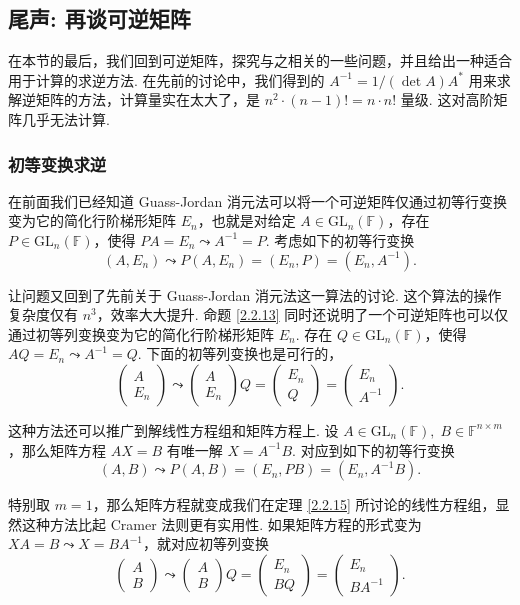 \documentclass[10pt,openany]{article}
\theoremstyle{thmstyle} %
\theoremstyle{defstyle} %
\theoremstyle{prostyle} %
\theoremstyle{exastyle}
\theoremstyle{remstyle}
\newcommand{\F}{\mathbb{F}}
\newcommand{\gf}{\text{GL}_n(\mathbb{F})}
\newcommand{\nm}{^{n \times m}}
\begin{document}
\subsection{尾声: 再谈可逆矩阵}

在本节的最后，我们回到可逆矩阵，探究与之相关的一些问题，并且给出一种适合用于计算的求逆方法. 在先前的讨论中，我们得到的 \( A^{-1}= 1/(\det A) A^* \) 用来求解逆矩阵的方法，计算量实在太大了，是 \( n^2 \cdot (n-1)!=n \cdot n! \) 量级. 这对高阶矩阵几乎无法计算.

\subsubsection{初等变换求逆}

在前面我们已经知道 Guass-Jordan 消元法可以将一个可逆矩阵仅通过初等行变换变为它的简化行阶梯形矩阵 \( E_n \)，也就是对给定 \( A \in \gf \)，存在 \(  P \in \gf \)，使得 \( PA=E_n \leadsto A^{-1}=P \). 考虑如下的初等行变换
\[ (A,E_n) \leadsto P(A,E_n)=(E_n,P)=(E_n,A^{-1}). \]

让问题又回到了先前关于  Guass-Jordan 消元法这一算法的讨论. 这个算法的操作复杂度仅有 \( n^3 \)，效率大大提升. 命题 \ref{2.2.13} 同时还说明了一个可逆矩阵也可以仅通过初等列变换变为它的简化行阶梯形矩阵 \( E_n \). 存在 \( Q \in \gf \)，使得 \( AQ=E_n \leadsto A^{-1}=Q \). 下面的初等列变换也是可行的，
\[ \begin{pmatrix}
	A \\ E_n
\end{pmatrix} \leadsto \begin{pmatrix}
A \\ E_n
\end{pmatrix}Q=\begin{pmatrix}
E_n \\ Q
\end{pmatrix}=\begin{pmatrix}
E_n \\ A^{-1}
\end{pmatrix}. \]

这种方法还可以推广到解线性方程组和矩阵方程上. 设 \( A \in \gf, \; B \in \F\nm \)，那么矩阵方程 \( AX=B \) 有唯一解 \( X=A^{-1}B \). 对应到如下的初等行变换
\[ (A,B) \leadsto P(A,B)=(E_n,PB)=(E_n,A^{-1}B). \]

特别取 \( m=1 \)，那么矩阵方程就变成我们在定理 \ref{2.2.15} 所讨论的线性方程组，显然这种方法比起 Cramer 法则更有实用性. 如果矩阵方程的形式变为 \( XA=B \leadsto X=BA^{-1} \)，就对应初等列变换 
\[ \begin{pmatrix}
	A \\ B
\end{pmatrix} \leadsto \begin{pmatrix}
A \\ B
\end{pmatrix}Q=\begin{pmatrix}
	E_n \\ BQ
\end{pmatrix}=\begin{pmatrix}
	E_n \\ BA^{-1}
\end{pmatrix}. \]
\end{document}
